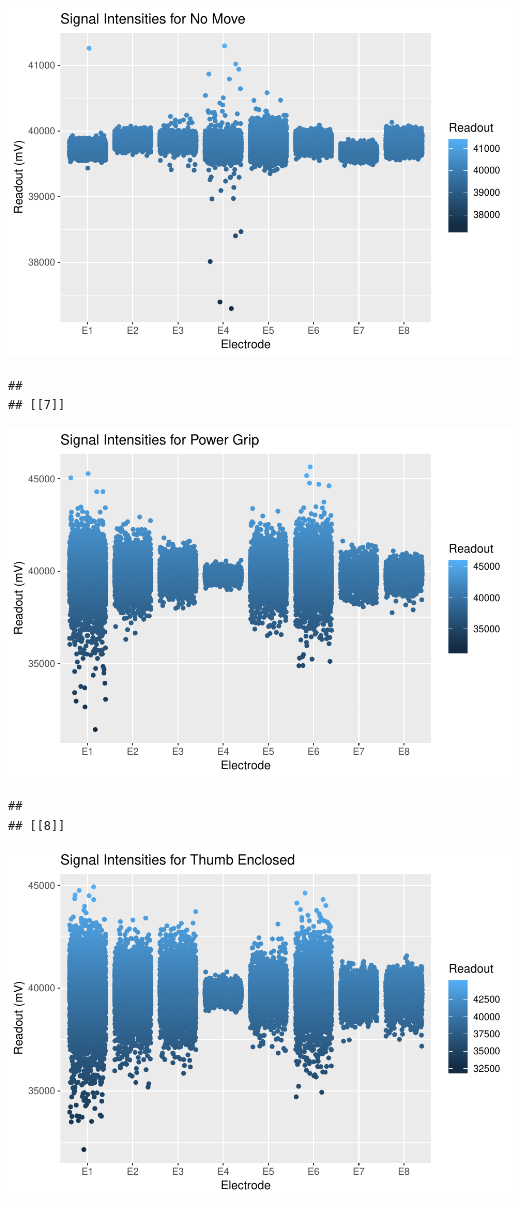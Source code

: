 \documentclass[]{article}
\begin{document}
\includegraphics{Megahand_files/figure-latex/unnamed-chunk-5-6.pdf}

\begin{verbatim}
## 
## [[7]]
\end{verbatim}

\includegraphics{Megahand_files/figure-latex/unnamed-chunk-5-7.pdf}

\begin{verbatim}
## 
## [[8]]
\end{verbatim}

\includegraphics{Megahand_files/figure-latex/unnamed-chunk-5-8.pdf}
\end{document}
